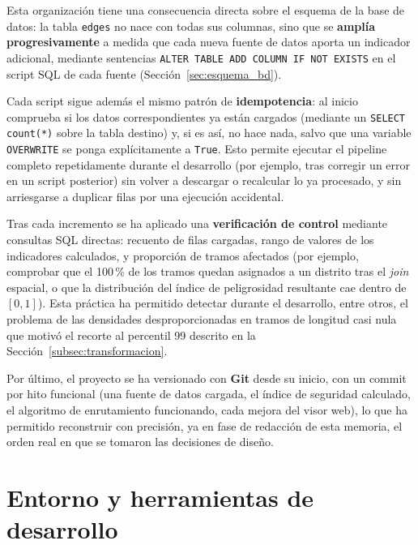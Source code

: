 Esta organización tiene una consecuencia directa sobre el esquema de la base de datos: la tabla \texttt{edges} no nace con todas sus columnas, sino que se \textbf{amplía progresivamente} a medida que cada nueva fuente de datos aporta un indicador adicional, mediante sentencias \texttt{ALTER TABLE ADD COLUMN IF NOT EXISTS} en el script SQL de cada fuente (Sección~\ref{sec:esquema_bd}).

Cada script sigue además el mismo patrón de \textbf{idempotencia}: al inicio comprueba si los datos correspondientes ya están cargados (mediante un \texttt{SELECT count(*)} sobre la tabla destino) y, si es así, no hace nada, salvo que una variable \texttt{OVERWRITE} se ponga explícitamente a \texttt{True}. Esto permite ejecutar el pipeline completo repetidamente durante el desarrollo (por ejemplo, tras corregir un error en un script posterior) sin volver a descargar o recalcular lo ya procesado, y sin arriesgarse a duplicar filas por una ejecución accidental.

Tras cada incremento se ha aplicado una \textbf{verificación de control} mediante consultas SQL directas: recuento de filas cargadas, rango de valores de los indicadores calculados, y proporción de tramos afectados (por ejemplo, comprobar que el 100\,\% de los tramos quedan asignados a un distrito tras el \textit{join} espacial, o que la distribución del índice de peligrosidad resultante cae dentro de $[0, 1]$). Esta práctica ha permitido detectar durante el desarrollo, entre otros, el problema de las densidades desproporcionadas en tramos de longitud casi nula que motivó el recorte al percentil 99 descrito en la Sección~\ref{subsec:transformacion}.

Por último, el proyecto se ha versionado con \textbf{Git} desde su inicio, con un commit por hito funcional (una fuente de datos cargada, el índice de seguridad calculado, el algoritmo de enrutamiento funcionando, cada mejora del visor web), lo que ha permitido reconstruir con precisión, ya en fase de redacción de esta memoria, el orden real en que se tomaron las decisiones de diseño.

\section{Entorno y herramientas de desarrollo}
\label{sec:entorno_herramientas}

